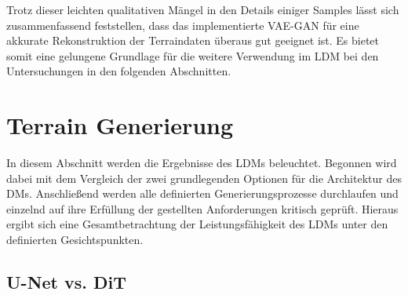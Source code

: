 Trotz dieser leichten qualitativen Mängel in den Details einiger Samples lässt sich zusammenfassend feststellen, dass das implementierte VAE-GAN für eine akkurate Rekonstruktion der Terraindaten überaus gut geeignet ist. Es bietet somit eine gelungene Grundlage für die weitere Verwendung im \ac{LDM} bei den Untersuchungen in den folgenden Abschnitten.

\section {Terrain Generierung}

In diesem Abschnitt werden die Ergebnisse des LDMs beleuchtet. Begonnen wird dabei mit dem Vergleich der zwei grundlegenden Optionen für die Architektur des \ac{DM}s. Anschließend werden alle definierten Generierungsprozesse durchlaufen und einzelnd auf ihre Erfüllung der gestellten Anforderungen kritisch geprüft. Hieraus ergibt sich eine Gesamtbetrachtung der Leistungsfähigkeit des \ac{LDM}s unter den definierten Gesichtspunkten. 

\subsection {U-Net vs. DiT}

